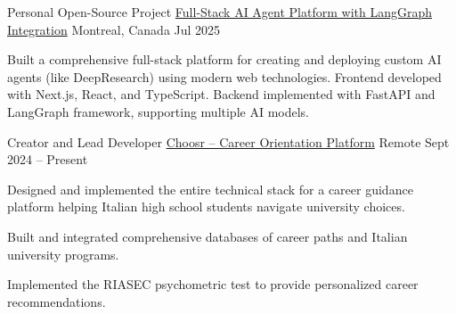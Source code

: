 
\newcommand\gitscale{0.015}
\newcommand\bpscale{0.028}

\begin{cventries}


\cventry
  {Personal Open-Source Project} %
  {\href{https://github.com/Dundalia/agent-studio}{Full-Stack AI Agent Platform with LangGraph Integration}} 
  {Montreal, Canada} %
  {Jul 2025} %
  {
    \begin{cvitems} %
      \item {Built a comprehensive full-stack platform for creating and deploying custom AI agents (like DeepResearch) using modern web technologies. Frontend developed with Next.js, React, and TypeScript. Backend implemented with FastAPI and LangGraph framework, supporting multiple AI models.}
    \end{cvitems}
  }
\cventry
  {Creator and Lead Developer} %
  {\href{https://choosr.it/esplora-carriere}{Choosr -- Career Orientation Platform}} 
  {Remote} %
  {Sept 2024 -- Present} %
  {
    \begin{cvitems} %
      \item {Designed and implemented the entire technical stack for a career guidance platform helping Italian high school students navigate university choices. }
      \item {Built and integrated comprehensive databases of career paths and Italian university programs.}
      \item {Implemented the RIASEC psychometric test to provide personalized career recommendations.}
    \end{cvitems}
  }



\end{cventries}
